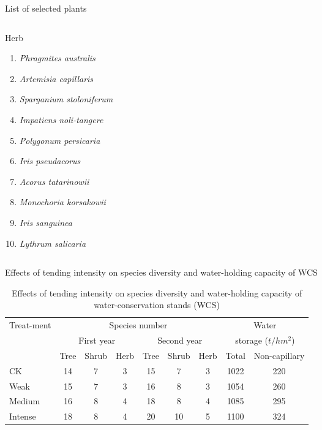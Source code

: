 \begin{frame}{List of selected plants}
\begin{columns}[T,onlytextwidth]
	\begin{exampleblock}{Herb}		
		\begin{enumerate}			
			\item \emph{Phragmites australis} \item \emph{Artemisia capillaris} \item \emph{Sparganium stoloniferum}
			\item \emph{Impatiens noli-tangere} \item \emph{Polygonum persicaria} \item \emph{Iris pseudacorus}
			\item \emph{Acorus tatarinowii} \item \emph{Monochoria korsakowii} \item \emph{Iris sanguinea}
			\item \emph{Lythrum salicaria}
		\end{enumerate}	
	\end{exampleblock}	
\end{columns}
\end{frame}


\begin{frame}{Effects of tending intensity on species diversity and water-holding capacity of WCS}
\begin{table}
	\caption{Effects of tending intensity on species diversity and water-holding capacity of water-conservation stands (WCS)}
	\begin{tabular}{@{}l@{}|@{}cccccc@{}|@{}cc@{}}
		\toprule
		\multirow[c]{3}{4ex}{Treat-ment} & \multicolumn{6}{c}{Species number} & \multicolumn{2}{|c}{Water}\\
		&\multicolumn{3}{c}{First year} & \multicolumn{3}{c}{Second year}& \multicolumn{2}{|c}{storage ($t/hm^2$)}\\
		&  Tree &\textcolor{colshrub}{Shrub} &\textcolor{colherb}{Herb}&Tree&\textcolor{colshrub}{Shrub}&\textcolor{colherb}{Herb}&Total& Non-capillary\\
		\midrule
		CK&14&7&3&15&7&3&1022&220\\
		Weak&15&7&3&16&8&3&1054&260\\
		Medium&16&8&4&18&8&4&1085&295\\
		Intense&18&8&4&20&10&5&1100&324\\
		\bottomrule
	\end{tabular}
\end{table}
\end{frame}

